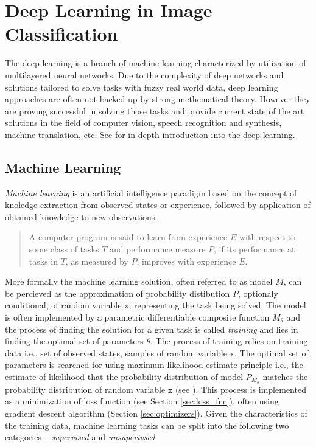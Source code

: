 \section{Deep Learning in Image Classification}
\label{sec:deep_learning}
The deep learning is a branch of machine learning characterized by utilization of multilayered neural networks. Due to the complexity of deep networks and solutions tailored to solve tasks with fuzzy real world data, deep learning approaches are often not backed up by strong methematical theory. However they are proving successful in solving those tasks and provide current state of the art solutions in the field of computer vision, speech recognition and synthesis, machine translation, etc. See \cite{Goodfellow-et-al-2016} for in depth introduction into the deep learning.

\subsection{Machine Learning}
\emph{Machine learning} is an artificial intelligence paradigm based on the concept of knoledge extraction from observed states or experience, followed by application of obtained knowledge to new observations.

\begin{quotation}
A computer program is said to learn from experience $E$ with respect to some class of tasks $T$ and performance measure $P$, if its performance at tasks in $T$, as measured by $P$, improves with experience $E$. \cite{Mitchell-1997}
\end{quotation}

\noindent More formally the machine learning solution, often referred to as model $M$, can be percieved as the approximation of probability distibution $P$, optionaly conditional, of random variable $\mathtt{x}$, representing the task being solved. The model is often implemented by a parametric differentiable composite function $M_\theta$ and the process of finding the solution for a given task is called \emph{training} and lies in finding the optimal set of parameters $\theta$. The process of training relies on training data i.e., set of observed states, samples of random variable $\mathtt{x}$. The optimal set of parameters is searched for using maximum likelihood estimate principle i.e., the estimate of likelihood that the probability distribution of model $P_{M_\theta}$ matches the probability distribution of random variable $\mathtt{x}$ (see \cite{ml_flach}). This process is implemented as a minimization of loss function (see Section \ref{sec:loss_fnc}), often using gradient descent algorithm (Section \ref{sec:optimizers}). Given the characteristics of the training data, machine learning tasks can be split into the following two categories -- \emph{supervised} and \emph{unsuperivsed}

